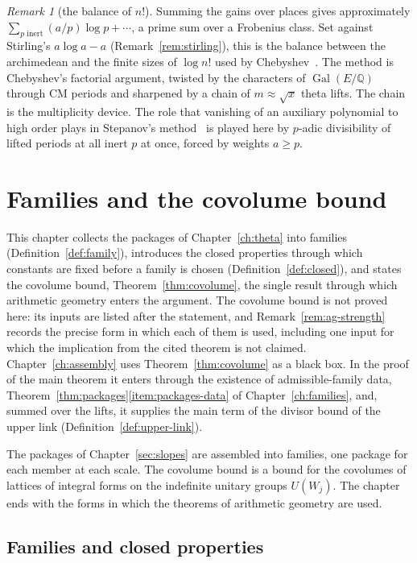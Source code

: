 \documentclass[11pt]{amsbook}
\theoremstyle{plain}
\theoremstyle{definition}
\theoremstyle{remark}
\newtheorem{remark}[theorem]{Remark}
\numberwithin{equation}{section}
\numberwithin{figure}{chapter}
\numberwithin{table}{chapter}
\newcommand{\Q}{\mathbb{Q}}
\newcommand{\Gal}{\operatorname{Gal}}
\begin{document}
\begin{remark}[the balance of $n!$]\label{rem:factorial}
Summing the gains over places gives approximately
$\sum_{p\text{ inert}}(a/p)\log p+\cdots$, a prime sum over a
Frobenius class. Set against Stirling's $a\log a-a$
(Remark~\ref{rem:stirling}), this is the balance between the
archimedean and the finite sizes of $\log n!$ used by
Chebyshev~\cite{Chebyshev1852}. The method is Chebyshev's factorial
argument, twisted by the characters of $\Gal(E/\Q)$ through CM periods
and sharpened by a chain of $m\approx\sqrt x$ theta lifts. The chain
is the multiplicity device. The role that vanishing of an auxiliary
polynomial to high order plays in Stepanov's
method~\cite{Stepanov1969} is played here by $p$-adic divisibility of
lifted periods at all inert $p$ at once, forced by weights $a\ge p$.
\end{remark}
\clearpage
\clearpage
\chapter{Families and the covolume bound}
\label{ch:covolume}\label{sec:covolume}

This chapter collects the packages of Chapter~\ref{ch:theta} into
families (Definition~\ref{def:family}), introduces the closed
properties through which constants are fixed before a family is chosen
(Definition~\ref{def:closed}), and states the covolume bound,
Theorem~\ref{thm:covolume}, the single result through which arithmetic
geometry enters the argument. The covolume bound is not proved here:
its inputs are listed after the statement, and
Remark~\ref{rem:ag-strength} records the precise form in which each of
them is used, including one input for which the implication from the
cited theorem is not claimed. Chapter~\ref{ch:assembly} uses
Theorem~\ref{thm:covolume} as a black box. In the proof of the main
theorem it enters through the existence of admissible-family data,
Theorem~\ref{thm:packages}\ref{item:packages-data} of
Chapter~\ref{ch:families}, and, summed over the lifts, it supplies
the main term of the divisor bound of the upper link
(Definition~\ref{def:upper-link}).

The packages of Chapter~\ref{sec:slopes} are assembled into families,
one package for each member at each scale. The covolume bound is
a bound for the covolumes of lattices of integral forms on the
indefinite unitary groups $U(W_j)$. The chapter ends with
the forms in which the theorems of arithmetic geometry are used.

\section{Families and closed properties}
\end{document}
